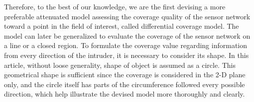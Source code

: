 \documentclass[3p]{elsarticle}
\begin{document}
%
Therefore, to the best of our knowledge, we are the first devising a more preferable attenuated model assessing the coverage quality of the sensor network toward a point in the field of interest, called differential coverage model. The model can later be generalized to evaluate the coverage of the sensor network on a line or a closed region. To formulate the coverage value regarding information from every direction of the intruder, it is necessary to consider its shape. In this article, without loose generality, shape of object is assumed as a circle. This geometrical shape is sufficient since the coverage is considered in the 2-D plane only, and the circle itself has parts of the circumference followed every possible direction, which help illustrate the devised model more thoroughly and clearly.\par
\end{document}
